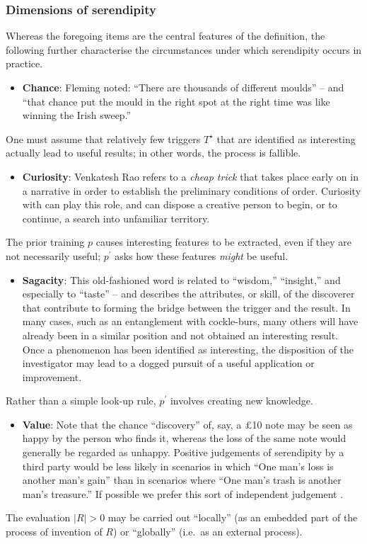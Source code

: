 \subsubsection*{Dimensions of serendipity}

Whereas the foregoing items are the central features of the
definition, the following further characterise the circumstances under
which serendipity occurs in practice.

\begin{itemize}
\item \textbf{Chance}: Fleming \citeyear{fleming} noted: ``There are
  thousands of different moulds'' -- and ``that chance put the mould
  in the right spot at the right time was like winning the Irish
  sweep.''
\end{itemize}
%
One must assume that relatively few triggers $T^\star$ that are
identified as interesting actually lead to useful results; in other
words, the process is fallible.
\begin{itemize}
\item \textbf{Curiosity}: Venkatesh Rao \citeyear{rao2011tempo} refers
  to a \emph{cheap trick} that takes place early on in a narrative in
  order to establish the preliminary conditions of order.  Curiosity
  with can play this role, and can dispose a creative person to begin,
  or to continue, a search into unfamiliar territory.
\end{itemize}
%
The prior training $p$ causes interesting features to be
  extracted, even if they are not necessarily useful; $p^{\prime}$
  asks how these features \emph{might} be useful.  
\begin{itemize}
\item \textbf{Sagacity}: This old-fashioned word is related to
  ``wisdom,'' ``insight,'' and especially to ``taste'' -- and
  describes the attributes, or skill, of the discoverer that
  contribute to forming the bridge between the trigger and the result.
  In many cases, such as an entanglement with cockle-burs, many others
  will have already been in a similar position and not obtained an
  interesting result.  Once a phenomenon has been identified as
  interesting, the disposition of the investigator may lead to a
  dogged pursuit of a useful application or improvement.
\end{itemize}
%
Rather than a simple look-up rule, $p^{\prime}$ involves creating new knowledge.
\begin{itemize}
\item \textbf{Value}: Note that the chance ``discovery'' of, say, a
  \pounds 10 note may be seen as happy by the person who finds it,
  whereas the loss of the same note would generally be regarded as
  unhappy.  Positive judgements of serendipity by a third party would
  be less likely in scenarios in which ``One man's loss is another
  man's gain'' than in scenarios where ``One man's trash is another
  man's treasure.''  If possible we prefer this sort of independent
  judgement \cite{jordanous:12}.
\end{itemize}
%
The evaluation $|R|>0$ may be carried out ``locally'' (as
  an embedded part of the process of invention of $R$) or ``globally''
  (i.e.~as an external process).  

